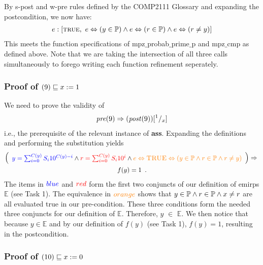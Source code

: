 \documentclass[headings=small,a4paper,12pt]{scrartcl}
\newcommand{\pre}{\mathit{pre}}
\newcommand{\post}{\mathit{post}}
\newcommand{\emirp}{\mathbb{E}}
\newcommand{\primeset}{\mathbb{P}}
\begin{document}
By s-post and w-pre rules defined by the COMP2111 Glossary and expanding the postcondition, we now have:
\begin{gather*}
e:\left[\textsc{true},\ e\EQUIV(y\in\primeset)\And e\EQUIV(r\in\primeset)\And e\EQUIV(r\neq y)\right]
\end{gather*}
This meets the function specifications of mpz$\_$probab$\_$prime$\_$p and mpz$\_$cmp as defined above. Note that we are taking the intersection of all three calls simultaneously to forego writing each function refinement seperately.

\subsubsection{Proof of $(9)\sqsubseteq x\mathrel{:=} 1$}
\label{sec:proof9ass}

We need to prove the validity of
\begin{gather*}
  \pre(9) \Implies (\post(9))\subst{1}x
\end{gather*}
i.e., the prerequisite of the relevant instance of \textbf{ass}.
Expanding the definitions and performing the substitution yields
\begin{gather*}
  \left(
    \begin{array}{l}
      {\color{blue}y=\sum_{i=0}^{C(y)} S_i 10^{C(y)-i}}\And {\color{red}r=\sum_{i=0}^{C(y)} S_i 10^i}\And {\color{orange}e\EQUIV\textsc{TRUE}\EQUIV(y\in\primeset\And r\in\primeset\And r\neq y)}
    \end{array}
  \right) \Implies{}\\
  f(y)=1\enskip.
\end{gather*}
The items in ${\color{blue}blue}$ and ${\color{red}red}$ form the first two conjuncts of our definition of emirps $\emirp$ (see Task 1). The equivalence in ${\color{orange}orange}$ shows that $y\in\primeset\And r\in\primeset \And x\neq r$ are all evaluated true in our pre-condition.  These three conditions form the needed three conjuncts for our definition of $\emirp$.  Therefore, $y$ $\in$ $\emirp$. We then notice that because $y\in\emirp$ and by our definition of $f(y)$ (see Task 1), $f(y)=1$, resulting in the postcondition.

\subsubsection{Proof of $(10)\sqsubseteq x\mathrel{:=} 0$}
\label{sec:proof10ass}
\end{document}
